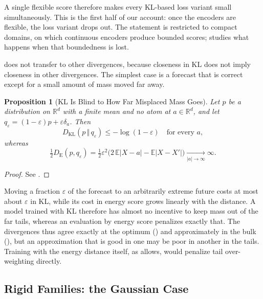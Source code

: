 \documentclass[11pt]{article}
\theoremstyle{plain}
\newtheorem{proposition}[theorem]{Proposition}
\theoremstyle{definition}
\theoremstyle{remark}
\newcommand{\RR}{\mathbb{R}}
\newcommand{\E}{\mathbb{E}}
\newcommand{\KL}[2]{D_{\mathrm{KL}}\!\left(#1\,\Vert\,#2\right)}
\newcommand{\DE}{D_{\mathrm{E}}}
\newcommand{\abs}[1]{\left\lvert #1 \right\rvert}
\begin{document}
A single flexible score therefore makes every KL-based loss variant small
simultaneously. This is the first half of our account: once the encoders
are flexible, the loss variant drops out. The statement is restricted to
compact domains, on which continuous encoders produce bounded scores;
 studies what happens when that boundedness is lost.

 does not transfer to other divergences, because
closeness in KL does not imply closeness in other divergences. The simplest
case is a forecast that is correct except for a small amount of mass moved far
away.

\begin{proposition}[KL Is Blind to How Far Misplaced Mass Goes]
 \label{prop:klblind}
 Let $p$ be a distribution on $\RR^{d}$ with a finite mean and no atom at
 $a\in\RR^d$, and let $q_\varepsilon=(1-\varepsilon)p+\varepsilon\delta_a$.
 Then
 \begin{equation*}
  \KL{p}{q_\varepsilon}\le-\log(1-\varepsilon)\quad\text{for every }a,
 \end{equation*}
 whereas
 \begin{equation*}
  \tfrac12\DE(p,q_\varepsilon)
  =\tfrac12\varepsilon^{2}\bigl(2\,\E\abs{X-a}-\E\abs{X-X'}\bigr)
  \xrightarrow[\abs{a}\to\infty]{}\infty.
 \end{equation*}
\end{proposition}
\begin{proof}
 See .
\end{proof}

Moving a fraction $\varepsilon$ of the forecast to an arbitrarily extreme
future costs at most about $\varepsilon$ in KL, while its cost in energy
score grows linearly with the distance. A model trained with KL therefore has
almost no incentive to keep mass out of the far tails, whereas an evaluation
by energy score penalizes exactly that. The divergences thus agree exactly at
the optimum () and approximately in the bulk
(), but an approximation that is good in one may be
poor in another in the tails. Training with the energy distance itself, as
\cite[Rem.~3.5]{baptista2025mathematical} allows, would penalize tail
over-weighting directly.

\subsection{Rigid Families: the Gaussian Case}
\label{ssec:gaussian}
\end{document}
